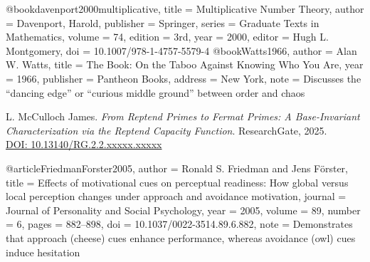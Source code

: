@book{davenport2000multiplicative,
  title     = {Multiplicative Number Theory},
  author    = {Davenport, Harold},
  publisher = {Springer},
  series    = {Graduate Texts in Mathematics},
  volume    = {74},
  edition   = {3rd},
  year      = {2000},
  editor    = {Hugh L. Montgomery},
  doi       = {10.1007/978-1-4757-5579-4}
}
@book{Watts1966,
  author    = {Alan W. Watts},
  title     = {The Book: On the Taboo Against Knowing Who You Are},
  year      = {1966},
  publisher = {Pantheon Books},
  address   = {New York},
  note      = {Discusses the ``dancing edge'' or ``curious middle ground'' between order and chaos}
}

L. McCulloch James.
\emph{From Reptend Primes to Fermat Primes: A Base-Invariant Characterization via the Reptend Capacity Function}.
ResearchGate, 2025. \\
\href{https://www.researchgate.net/publication/399686298}{DOI: 10.13140/RG.2.2.xxxxx.xxxxx}

@article{FriedmanForster2005,
  author    = {Ronald S. Friedman and Jens Förster},
  title     = {Effects of motivational cues on perceptual readiness: How global versus local perception changes under approach and avoidance motivation},
  journal   = {Journal of Personality and Social Psychology},
  year      = {2005},
  volume    = {89},
  number    = {6},
  pages     = {882--898},
  doi       = {10.1037/0022-3514.89.6.882},
  note      = {Demonstrates that approach (cheese) cues enhance performance, whereas avoidance (owl) cues induce hesitation}
}



